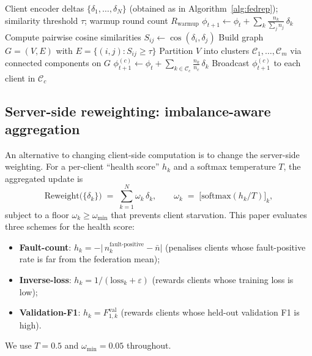 \documentclass[preprint,12pt,authoryear]{elsarticle}
\begin{document}
\begin{algorithm}[!ht]
\caption{FedCCFA round at communication round $t$.}
\label{alg:fedccfa}
\begin{algorithmic}[1]
\Require Client encoder deltas $\{\delta_1, \ldots, \delta_N\}$ (obtained as in Algorithm~\ref{alg:fedrep}); similarity threshold $\tau$; warmup round count $R_{\mathrm{warmup}}$
    \State $\phi_{t+1} \gets \phi_t + \sum_{k} \frac{n_k}{\sum_{j} n_j}\, \delta_k$ 
\Else
    \State Compute pairwise cosine similarities $S_{ij} \gets \cos(\delta_i, \delta_j)$
    \State Build graph $G = (V, E)$ with $E = \{(i, j) : S_{ij} \geq \tau\}$
    \State Partition $V$ into clusters $\mathcal{C}_1, \ldots, \mathcal{C}_m$ via connected components on $G$
        \State $\phi^{(c)}_{t+1} \gets \phi_t + \sum_{k \in \mathcal{C}_c} \frac{n_k}{n_c}\, \delta_k$
    \EndFor
    \State Broadcast $\phi^{(c)}_{t+1}$ to each client in $\mathcal{C}_c$
\EndIf
\end{algorithmic}
\end{algorithm}

\subsection{Server-side reweighting: imbalance-aware aggregation}
\label{subsec:reweight}

An alternative to changing client-side computation is to change the
server-side weighting. For a per-client ``health score'' $h_k$ and
a softmax temperature $T$, the aggregated update is
\begin{equation}
    \mathrm{Reweight}\bigl(\{\delta_k\}\bigr)
    \;=\; \sum_{k=1}^{N} \omega_k\, \delta_k,
    \qquad
    \omega_k \;=\; \bigl[\mathrm{softmax}(h_k / T)\bigr]_k,
    \label{eq:reweight}
\end{equation}
subject to a floor $\omega_k \geq \omega_{\min}$ that prevents
client starvation. This paper evaluates three schemes for the
health score:
\begin{itemize}
    \item \textbf{Fault-count}: $h_k = -\bigl|\, n_k^{\text{fault-positive}} - \bar{n}\bigr|$ (penalises clients whose fault-positive rate is far from the federation mean);
    \item \textbf{Inverse-loss}: $h_k = 1 / (\text{loss}_k + \varepsilon)$ (rewards clients whose training loss is low);
    \item \textbf{Validation-F1}: $h_k = F_{1,k}^{\mathrm{val}}$ (rewards clients whose held-out validation F1 is high).
\end{itemize}
We use $T = 0.5$ and $\omega_{\min} = 0.05$ throughout.
\end{document}
